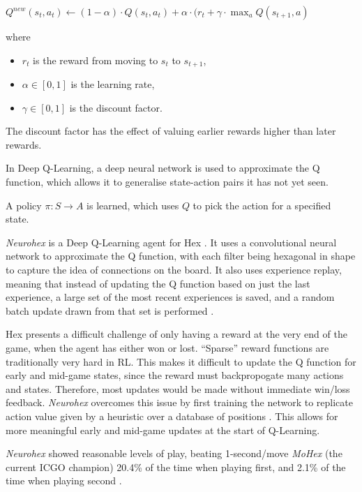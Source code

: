 $Q^{new}(s_t, a_t) \leftarrow (1-\alpha)\cdot Q(s_t, a_t) + \alpha \cdot (r_t + \gamma \cdot \max_{a}Q(s_{t+1},a)$


where 

\begin{itemize}
    \item $r_t$ is the reward from moving to $s_t$ to $s_{t+1}$,
    \item $\alpha \in [0,1]$ is the learning rate,
    \item $\gamma \in [0,1]$ is the discount factor.
\end{itemize}

The discount factor has the effect of valuing earlier rewards higher than later rewards.

In Deep Q-Learning, a deep neural network is used to approximate the Q function, which allows it to generalise state-action pairs it has not yet seen.

A policy $\pi : S \to A$ is learned, which uses $Q$ to pick the action for a specified state.

\textit{Neurohex} is a Deep Q-Learning agent for Hex \cite{neurohex}. It uses a convolutional neural network to approximate the Q function, with each filter being hexagonal in shape to capture the idea of connections on the board. It also uses experience replay, meaning that instead of updating the Q function based on just the last experience,
a large set of the most recent experiences is saved, and a random batch update drawn from that set is performed \cite{neurohex}.

Hex presents a difficult challenge of only having a reward at the very end of the game, when the agent has either won or lost. ``Sparse'' reward functions are traditionally very hard in RL. This makes it difficult to update the Q function for early and mid-game states, since the reward must backpropogate many actions and states. Therefore, most updates would be made without immediate win/loss feedback. \textit{Neurohex} overcomes this issue by first training the network to replicate action value given by a heuristic over a database of positions \cite{neurohex}. This allows for more meaningful early and mid-game updates at the start of Q-Learning.

\textit{Neurohex} showed reasonable levels of play, beating 1-second/move \textit{MoHex} (the current ICGO champion) 20.4\% of the time when playing first, and 2.1\% of the time when playing second \cite{neurohex}.




